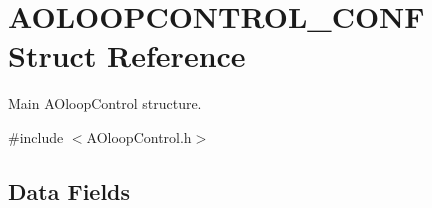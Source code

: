 \hypertarget{structAOLOOPCONTROL__CONF}{}\section{A\+O\+L\+O\+O\+P\+C\+O\+N\+T\+R\+O\+L\+\_\+\+C\+O\+N\+F Struct Reference}
\label{structAOLOOPCONTROL__CONF}


Main A\+Oloop\+Control structure.  




{\ttfamily \#include $<$A\+Oloop\+Control.\+h$>$}

\subsection*{Data Fields}
